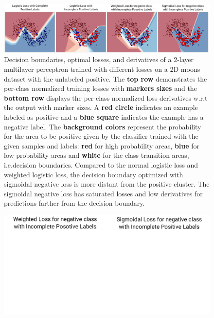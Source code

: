 \begin{figure}
\begin{center}
   \includegraphics[width=0.95\linewidth]{img/moons}
\end{center}
   \caption{
   Decision boundaries, optimal losses, and derivatives of a 2-layer multilayer perceptron trained with different losses on a 2D moons dataset with the unlabeled positive.
   The \textbf{top row} demonstrates the per-class normalized training losses with \textbf{markers sizes} and the \textbf{bottom row} displays the per-class normalized loss derivatives w.r.t the output with marker sizes.
   A \textbf{red circle} indicates an example labeled as positive and a \textbf{blue square} indicates the example has a negative label.
   The \textbf{background colors} represent the probability for the area to be positive given by the classifier trained with the given samples and labels: \textbf{red} for high probability areas, \textbf{blue} for low probability areas and \textbf{white} for the class transition areas, i.e.decision boundaries.
   Compared to the normal logistic loss and weighted logistic loss, the decision boundary optimized with sigmoidal negative loss is more distant from the positive cluster.
   The sigmoidal negative loss has saturated losses and low derivatives for predictions farther from the decision boundary.
   }
\label{fig:moons}
\end{figure}


\begin{figure}[t]
\begin{center}
   \includegraphics[width=\linewidth]{img/moons_diff}
\end{center}
   \caption{
   }
\label{fig:moonsdiff}
\end{figure}

